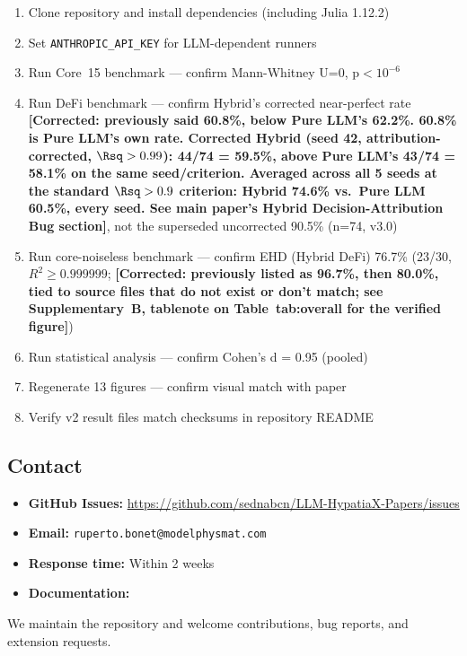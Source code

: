 \documentclass[twoside,11pt]{article}
\begin{document}
\begin{enumerate}
\item Clone repository and install dependencies (including Julia 1.12.2)
\item Set \texttt{ANTHROPIC\_API\_KEY} for LLM-dependent runners
\item Run Core~15 benchmark — confirm Mann-Whitney U=0, p$<10^{-6}$
\item Run DeFi benchmark --- confirm Hybrid's corrected near-perfect rate
  \textbf{[Corrected: previously said 60.8\%, below Pure LLM's 62.2\%.
  60.8\% is Pure LLM's own rate. Corrected Hybrid (seed 42,
  attribution-corrected, $\Rsq>0.99$): 44/74 = 59.5\%, above Pure LLM's
  43/74 = 58.1\% on the same seed/criterion. Averaged across all 5
  seeds at the standard $\Rsq>0.9$ criterion: Hybrid 74.6\% vs.\ Pure
  LLM 60.5\%, every seed. See main paper's Hybrid Decision-Attribution
  Bug section]}, not the superseded uncorrected 90.5\%
  (n=74, v3.0)
\item Run core-noiseless benchmark --- confirm EHD (Hybrid DeFi) 76.7\%
  (23/30, $R^2 \geq 0.999999$; \textbf{[Corrected: previously listed as
  96.7\%, then 80.0\%, tied to source files that do not exist or
  don't match; see Supplementary~B, tablenote on Table~tab:overall for
  the verified figure]})
\item Run statistical analysis — confirm Cohen's d = 0.95 (pooled)
\item Regenerate 13 figures — confirm visual match with paper
\item Verify v2 result files match checksums in repository README
\end{enumerate}

\subsection{Contact}

\begin{itemize}
\item \textbf{GitHub Issues:} \url{https://github.com/sednabcn/LLM-HypatiaX-Papers/issues}
\item \textbf{Email:} \texttt{ruperto.bonet@modelphysmat.com}
\item \textbf{Response time:} Within 2 weeks
\item \textbf{Documentation:} 
\end{itemize}

We maintain the repository and welcome contributions, bug reports, and extension requests.
\end{document}
